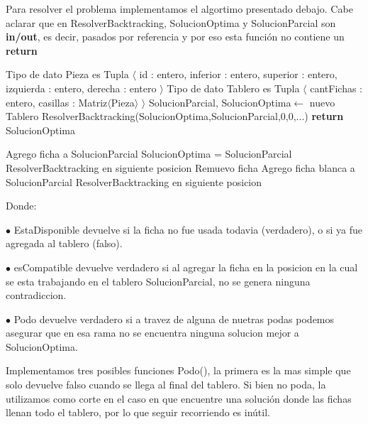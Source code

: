 Para resolver el problema implementamos el algortimo presentado debajo. Cabe aclarar que en ResolverBacktracking, SolucionOptima y SolucionParcial son \textbf{in/out}, es decir, pasados por referencia y por eso esta función no contiene un \textbf{return}

\begin{pseudo}
\State Tipo de dato Pieza es Tupla $\langle$ id : entero, inferior : entero, superior : entero, izquierda : entero, derecha : entero $\rangle$
\State Tipo de dato Tablero es Tupla $\langle$ cantFichas : entero, casillas : Matriz$\langle$Pieza$\rangle$ $\rangle$
        \State SolucionParcial, SolucionOptima$\leftarrow$ nuevo Tablero
        \State ResolverBacktracking(SolucionOptima,SolucionParcial,0,0,...) 
        \State \textbf{return} SolucionOptima
    \EndProcedure
\end{pseudo}

\begin{pseudo}

	    \State Agrego ficha a SolucionParcial
	      \State SolucionOptima = SolucionParcial
	    \EndIf
	      \State ResolverBacktracking en siguiente posicion
	    \EndIf
	    \State Remuevo ficha 
	  \EndIf
	\EndFor
        \State Agrego ficha blanca a SolucionParcial
        \State ResolverBacktracking en siguiente posicion
    \EndProcedure
\end{pseudo}

Donde: 

$\bullet$ EstaDisponible devuelve si la ficha no fue usada todavia (verdadero), o si ya fue agregada al tablero (falso).

$\bullet$ esCompatible devuelve verdadero si al agregar la ficha en la posicion en la cual se esta trabajando en el tablero SolucionParcial, no se genera ninguna contradiccion.

$\bullet$ Podo devuelve verdadero si a travez de alguna de nuetras podas podemos asegurar que en esa rama no se encuentra ninguna solucion mejor a SolucionOptima.

Implementamos tres posibles funciones Podo(), la primera es la mas simple que solo devuelve falso cuando se llega al final del tablero. Si bien no poda, la utilizamos como corte en el caso en que encuentre una solución donde las fichas llenan todo el tablero, por lo que seguir recorriendo es inútil.

